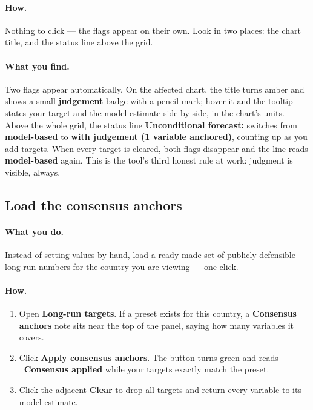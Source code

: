 \documentclass[11pt]{article}
\theoremstyle{definition}
\theoremstyle{remark}
\begin{document}
\paragraph{How.} Nothing to click --- the flags appear on their own. Look in two
places: the chart title, and the status line above the grid.

\paragraph{What you find.} Two flags appear automatically. On the affected chart, the
title turns amber and shows a small \textbf{judgement} badge with a pencil mark; hover
it and the tooltip states your target and the model estimate side by side, in the
chart's units. Above the whole grid, the status line \textbf{Unconditional forecast:}
switches from \textbf{model-based} to \textbf{with judgement (1 variable anchored)},
counting up as you add targets. When every target is cleared, both flags disappear and
the line reads \textbf{model-based} again. This is the tool's third honest rule at
work: judgment is visible, always.

\subsection{Load the consensus anchors}

\paragraph{What you do.} Instead of setting values by hand, load a ready-made set of
publicly defensible long-run numbers for the country you are viewing --- one click.

\paragraph{How.}
\begin{enumerate}
  \item Open \textbf{Long-run targets}. If a preset exists for this country, a
    \textbf{Consensus anchors} note sits near the top of the panel, saying how many
    variables it covers.
  \item Click \textbf{Apply consensus anchors}. The button turns green and reads
    \textbf{\checkmark~Consensus applied} while your targets exactly match the preset.
  \item Click the adjacent \textbf{Clear} to drop all targets and return every
    variable to its model estimate.
\end{enumerate}
\end{document}
